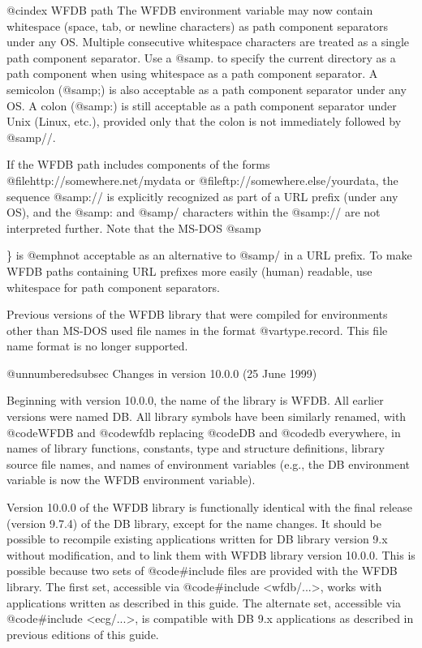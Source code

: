 {{{{{{{{@cindex WFDB path
The WFDB environment variable may now contain whitespace (space, tab, or
newline characters) as path component separators under any OS.  Multiple
consecutive whitespace characters are treated as a single path component
separator.  Use a @samp{.} to specify the current directory as a path component
when using whitespace as a path component separator.  A semicolon (@samp{;}) is
also acceptable as a path component separator under any OS.  A colon (@samp{:})
is still acceptable as a path component separator under Unix (Linux, etc.),
provided only that the colon is not immediately followed by @samp{//}.

If the WFDB path includes components of the forms
@file{http://somewhere.net/mydata} or @file{ftp://somewhere.else/yourdata}, the
sequence @samp{://} is explicitly recognized as part of a URL prefix (under any
OS), and the @samp{:} and @samp{/} characters within the @samp{://} are not
interpreted further.  Note that the MS-DOS @samp{\} is @emph{not} acceptable as
an alternative to @samp{/} in a URL prefix.  To make WFDB paths containing URL
prefixes more easily (human) readable, use whitespace for path component
separators.

Previous versions of the WFDB library that were compiled for environments other
than MS-DOS used file names in the format @var{type.record}.  This file
name format is no longer supported.

@unnumberedsubsec Changes in version 10.0.0 (25 June 1999)

Beginning with version 10.0.0, the name of the library is WFDB.  All
earlier versions were named DB.  All library symbols have been similarly
renamed, with @code{WFDB} and @code{wfdb} replacing @code{DB} and @code{db}
everywhere, in names of library functions, constants, type and structure
definitions, library source file names, and names of environment variables
(e.g., the DB environment variable is now the WFDB environment variable).

Version 10.0.0 of the WFDB library is functionally identical with the
final release (version 9.7.4) of the DB library, except for the name
changes.  It should be possible to recompile existing applications
written for DB library version 9.x without modification, and to link
them with WFDB library version 10.0.0.  This is possible because two
sets of @code{#include} files are provided with the WFDB library.  The
first set, accessible via @code{#include <wfdb/...>}, works with
applications written as described in this guide.  The alternate set,
accessible via @code{#include <ecg/...>}, is compatible with DB 9.x
applications as described in previous editions of this guide.


}}}}}}}}}

